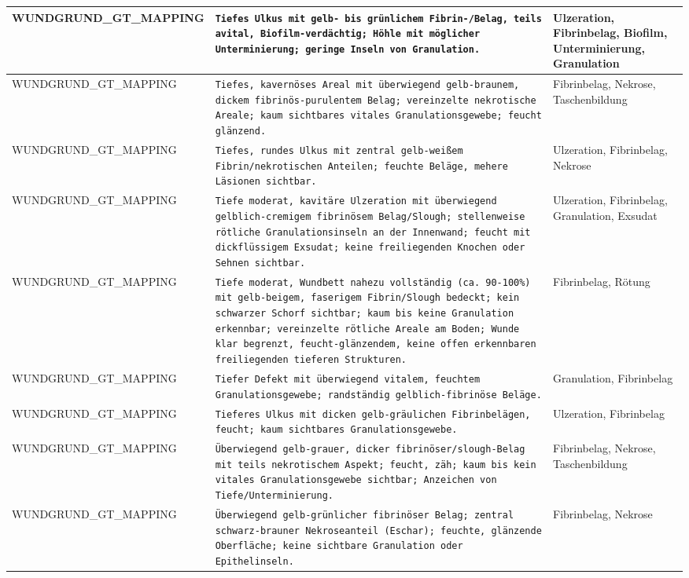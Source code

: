 \begin{longtable}{|p{3.5cm}|p{5cm}|p{6.5cm}|}
WUNDGRUND\_GT\_MAPPING & \texttt{Tiefes Ulkus mit gelb- bis grünlichem Fibrin-/Belag, teils avital, Biofilm-verdächtig; Höhle mit möglicher Unterminierung; geringe Inseln von Granulation.} & Ulzeration, Fibrinbelag, Biofilm, Unterminierung, Granulation \\ \hline
WUNDGRUND\_GT\_MAPPING & \texttt{Tiefes, kavernöses Areal mit überwiegend gelb-braunem, dickem fibrinös-purulentem Belag; vereinzelte nekrotische Areale; kaum sichtbares vitales Granulationsgewebe; feucht glänzend.} & Fibrinbelag, Nekrose, Taschenbildung \\ \hline
WUNDGRUND\_GT\_MAPPING & \texttt{Tiefes, rundes Ulkus mit zentral gelb-weißem Fibrin/nekrotischen Anteilen; feuchte Beläge, mehere Läsionen sichtbar.} & Ulzeration, Fibrinbelag, Nekrose \\ \hline
WUNDGRUND\_GT\_MAPPING & \texttt{Tiefe moderat, kavitäre Ulzeration mit überwiegend gelblich-cremigem fibrinösem Belag/Slough; stellenweise rötliche Granulationsinseln an der Innenwand; feucht mit dickflüssigem Exsudat; keine freiliegenden Knochen oder Sehnen sichtbar.} & Ulzeration, Fibrinbelag, Granulation, Exsudat \\ \hline
WUNDGRUND\_GT\_MAPPING & \texttt{Tiefe moderat, Wundbett nahezu vollständig (ca. 90-100\%) mit gelb-beigem, faserigem Fibrin/Slough bedeckt; kein schwarzer Schorf sichtbar; kaum bis keine Granulation erkennbar; vereinzelte rötliche Areale am Boden; Wunde klar begrenzt, feucht-glänzendem, keine offen erkennbaren freiliegenden tieferen Strukturen.} & Fibrinbelag, Rötung \\ \hline
WUNDGRUND\_GT\_MAPPING & \texttt{Tiefer Defekt mit überwiegend vitalem, feuchtem Granulationsgewebe; randständig gelblich-fibrinöse Beläge.} & Granulation, Fibrinbelag \\ \hline
WUNDGRUND\_GT\_MAPPING & \texttt{Tieferes Ulkus mit dicken gelb-gräulichen Fibrinbelägen, feucht; kaum sichtbares Granulationsgewebe.} & Ulzeration, Fibrinbelag \\ \hline
WUNDGRUND\_GT\_MAPPING & \texttt{Überwiegend gelb-grauer, dicker fibrinöser/slough-Belag mit teils nekrotischem Aspekt; feucht, zäh; kaum bis kein vitales Granulationsgewebe sichtbar; Anzeichen von Tiefe/Unterminierung.} & Fibrinbelag, Nekrose, Taschenbildung \\ \hline
WUNDGRUND\_GT\_MAPPING & \texttt{Überwiegend gelb-grünlicher fibrinöser Belag; zentral schwarz-brauner Nekroseanteil (Eschar); feuchte, glänzende Oberfläche; keine sichtbare Granulation oder Epithelinseln.} & Fibrinbelag, Nekrose \\ \hline

\end{longtable}
